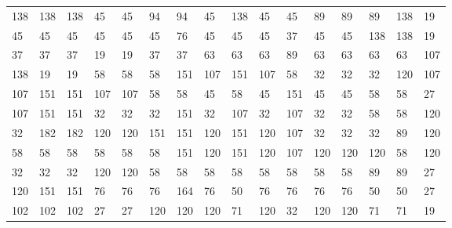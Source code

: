 \begin{longtable}{*{16}{l}}
138& 138& 138& 45& 45& 94& 94& 45& 138& 45& 45& 89& 89& 89& 138& 19\\
45& 45& 45& 45& 45& 45& 76& 45& 45& 45& 37& 45& 45& 138& 138& 19\\
37& 37& 37& 19& 19& 37& 37& 63& 63& 63& 89& 63& 63& 63& 63& 107\\
138& 19& 19& 58& 58& 58& 151& 107& 151& 107& 58& 32& 32& 32& 120& 107\\
107& 151& 151& 107& 107& 58& 58& 45& 58& 45& 151& 45& 45& 58& 58& 27\\
107& 151& 151& 32& 32& 32& 151& 32& 107& 32& 107& 32& 32& 58& 58& 120\\
32& 182& 182& 120& 120& 151& 151& 120& 151& 120& 107& 32& 32& 32& 89& 120\\
58& 58& 58& 58& 58& 58& 151& 120& 151& 120& 107& 120& 120& 120& 58& 120\\
32& 32& 32& 120& 120& 58& 58& 58& 58& 58& 58& 58& 58& 89& 89& 27\\
120& 151& 151& 76& 76& 76& 164& 76& 50& 76& 76& 76& 76& 50& 50& 27\\
102& 102& 102& 27& 27& 120& 120& 120& 71& 120& 32& 120& 120& 71& 71& 19\\
\bottomrule\end{longtable}
